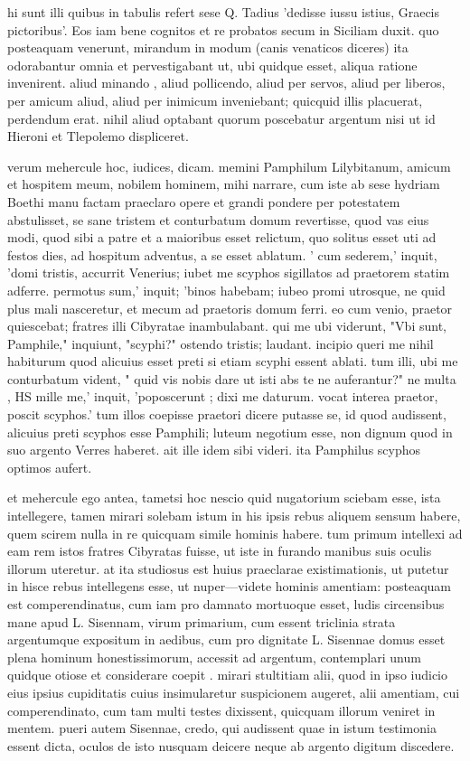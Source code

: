  hi sunt illi quibus in tabulis refert sese Q. Tadius 'dedisse iussu istius, Graecis pictoribus'. Eos iam bene cognitos et re probatos secum in Siciliam duxit. quo posteaquam venerunt, mirandum in modum (canis venaticos diceres) ita odorabantur omnia et pervestigabant ut, ubi quidque esset, aliqua ratione invenirent. aliud minando , aliud pollicendo, aliud per servos, aliud per liberos, per amicum aliud, aliud per inimicum inveniebant; quicquid illis placuerat, perdendum erat. nihil aliud optabant quorum poscebatur argentum nisi ut id Hieroni et Tlepolemo displiceret.

 verum mehercule hoc, iudices, dicam. memini Pamphilum Lilybitanum, amicum et hospitem meum, nobilem hominem, mihi narrare, cum iste ab sese hydriam Boethi manu factam praeclaro opere et grandi pondere per potestatem abstulisset, se sane tristem et conturbatum domum revertisse, quod vas eius modi, quod sibi a patre et a maioribus esset relictum, quo solitus esset uti ad festos dies, ad hospitum adventus, a se esset ablatum. ' cum sederem,' inquit, 'domi tristis, accurrit Venerius; iubet me scyphos sigillatos ad praetorem statim adferre. permotus sum,' inquit; 'binos habebam; iubeo promi utrosque, ne quid plus mali nasceretur, et mecum ad praetoris domum ferri. eo cum venio, praetor quiescebat; fratres illi Cibyratae inambulabant. qui me ubi viderunt, "Vbi sunt, Pamphile," inquiunt, "scyphi?" ostendo tristis; laudant. incipio queri me nihil habiturum quod alicuius esset preti si etiam scyphi essent ablati. tum illi, ubi me conturbatum vident, " quid vis nobis dare ut isti abs te ne auferantur?" ne multa , HS mille me,' inquit, 'poposcerunt ; dixi me daturum. vocat interea praetor, poscit scyphos.' tum illos coepisse praetori dicere putasse se, id quod audissent, alicuius preti scyphos esse Pamphili; luteum negotium esse, non dignum quod in suo argento Verres haberet. ait ille idem sibi videri. ita Pamphilus scyphos optimos aufert.

 et mehercule ego antea, tametsi hoc nescio quid nugatorium sciebam esse, ista intellegere, tamen mirari solebam istum in his ipsis rebus aliquem sensum habere, quem scirem nulla in re quicquam simile hominis habere. tum primum intellexi ad eam rem istos fratres Cibyratas fuisse, ut iste in furando manibus suis oculis illorum uteretur. at ita studiosus est huius praeclarae existimationis, ut putetur in hisce rebus intellegens esse, ut nuper—videte hominis amentiam: posteaquam est comperendinatus, cum iam pro damnato mortuoque esset, ludis circensibus mane apud L. Sisennam, virum primarium, cum essent triclinia strata argentumque expositum in aedibus, cum pro dignitate L. Sisennae domus esset plena hominum honestissimorum, accessit ad argentum, contemplari unum quidque otiose et considerare coepit . mirari stultitiam alii, quod in ipso iudicio eius ipsius cupiditatis cuius insimularetur suspicionem augeret, alii amentiam, cui comperendinato, cum tam multi testes dixissent, quicquam illorum veniret in mentem. pueri autem Sisennae, credo, qui audissent quae in istum testimonia essent dicta, oculos de isto nusquam deicere neque ab argento digitum discedere.

